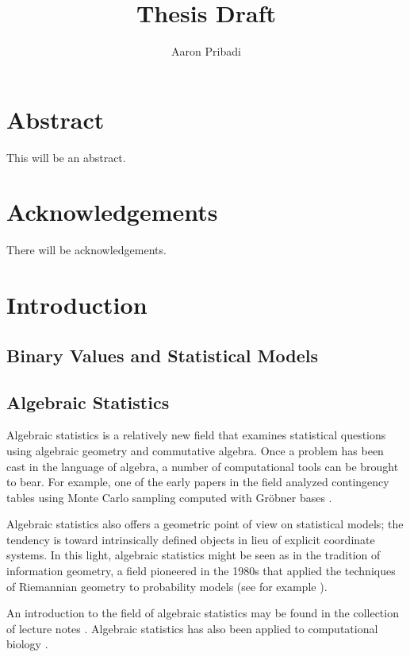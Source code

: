 \documentclass[cclicense]{hmcthesis}
\title{Thesis Draft}
\author{Aaron Pribadi}
\numberwithin{equation}{section}
\begin{document}
\frontmatter

\maketitle

\tableofcontents


\chapter{Abstract}
    This will be an abstract.

\chapter{Acknowledgements}
    There will be acknowledgements.

\mainmatter

\chapter{Introduction}

\section{Binary Values and Statistical Models}

\section{Algebraic Statistics}

    Algebraic statistics is a relatively new field that examines statistical
    questions using algebraic geometry and commutative algebra.  Once a problem
    has been cast in the language of algebra, a number of computational tools
    can be brought to bear.  For example, one of the early papers in the field
    analyzed contingency tables using Monte Carlo sampling computed with Gröbner
    bases \citep{DS98}.

    Algebraic statistics also offers a geometric point of view on statistical
    models; the tendency is toward intrinsically defined objects in lieu of
    explicit coordinate systems.  In this light, algebraic statistics might be
    seen as in the tradition of information geometry, a field pioneered in the
    1980s that applied the techniques of Riemannian geometry to probability
    models (see for example \citep{Ama}).

    An introduction to the field of algebraic statistics may be found in the
    collection of lecture notes \citep{DSS08}.  Algebraic statistics has also
    been applied to computational biology \citep{ASCB}.
\end{document}
